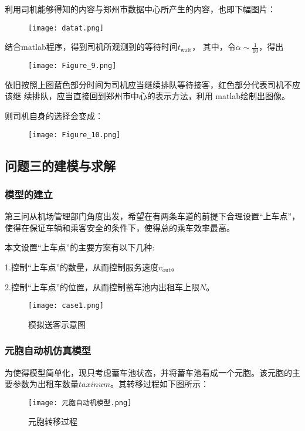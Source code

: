 \documentclass[withoutpreface,bwprint]{cumcmthesis} %
\begin{document}
利用司机能够得知的内容与郑州市数据中心所产生的内容，也即下幅图片：\par
\begin{figure}[!h]
	\centering
	\texttt{[image: datat.png]}
	\caption{}
\end{figure}

结合matlab程序，得到司机所观测到的等待时间$t_{\mathrm{wait}}$，
其中，令$\alpha\sim\frac{1}{10}$，得出\par
\begin{figure}[!h]
	\centering
	\texttt{[image: Figure\_9.png]}
	\caption{}
\end{figure}
\newpage
依旧按照上图蓝色部分时间为司机应当继续排队等待接客，红色部分代表司机不应该继
续排队，应当直接回到郑州市中心的表示方法，利用 matlab绘制出图像。\par
则司机自身的选择会变成：\par
\begin{figure}[!h]
	\centering
	\texttt{[image: Figure\_10.png]}
	\caption{}
\end{figure}


\newpage
\subsection{问题三的建模与求解}

\subsubsection{模型的建立}
第三问从机场管理部门角度出发，希望在有两条车道的前提下合理设置“上车点”，使得在保证车辆和乘客安全的条件下，使得总的乘车效率最高。\par
本文设置“上车点”的主要方案有以下几种:\par
1.控制“上车点”的数量，从而控制服务速度$v_{\mathrm{out}}$。\par
2.控制“上车点”的位置，从而控制蓄车池内出租车上限$N$。\par


\begin{figure}[!h]
	\centering
	\texttt{[image: case1.png]}
	\caption{模拟送客示意图}
\end{figure}

\subsubsection{元胞自动机仿真模型}

为使得模型简单化，现只考虑蓄车池状态，并将蓄车池看成一个元胞。该元胞的主要参数为出租车数量$taxinum$。其转移过程如下图所示：
\begin{figure}[!h]
	\centering
	\texttt{[image: 元胞自动机模型.png]}
	\caption{元胞转移过程}
\end{figure}
\end{document}
